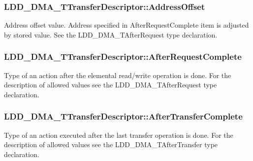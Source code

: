 \subsubsection[{Address\+Offset}]{ L\+D\+D\+\_\+\+D\+M\+A\+\_\+\+T\+Transfer\+Descriptor\+::\+Address\+Offset}\label{struct_l_d_d___d_m_a___t_transfer_descriptor_aff47307126179fdf6b241ca1b7371256}
Address offset value. Address specified in After\+Request\+Complete item is adjusted by stored value. See the L\+D\+D\+\_\+\+D\+M\+A\+\_\+\+T\+After\+Request type declaration. \hypertarget{struct_l_d_d___d_m_a___t_transfer_descriptor_aef9bdbecdd4c1e3e0072105bc194a63f}{}
\subsubsection[{After\+Request\+Complete}]{ L\+D\+D\+\_\+\+D\+M\+A\+\_\+\+T\+Transfer\+Descriptor\+::\+After\+Request\+Complete}\label{struct_l_d_d___d_m_a___t_transfer_descriptor_aef9bdbecdd4c1e3e0072105bc194a63f}
Type of an action after the elemental read/write operation is done. For the description of allowed values see the L\+D\+D\+\_\+\+D\+M\+A\+\_\+\+T\+After\+Request type declaration. \hypertarget{struct_l_d_d___d_m_a___t_transfer_descriptor_ad6046f40169d2ea20061906342615380}{}
\subsubsection[{After\+Transfer\+Complete}]{ L\+D\+D\+\_\+\+D\+M\+A\+\_\+\+T\+Transfer\+Descriptor\+::\+After\+Transfer\+Complete}\label{struct_l_d_d___d_m_a___t_transfer_descriptor_ad6046f40169d2ea20061906342615380}
Type of an action executed after the last transfer operation is done. For the description of allowed values see the L\+D\+D\+\_\+\+D\+M\+A\+\_\+\+T\+After\+Transfer type declaration. \hypertarget{struct_l_d_d___d_m_a___t_transfer_descriptor_a163633695c0c3e1a057dffae0e722d16}{}

